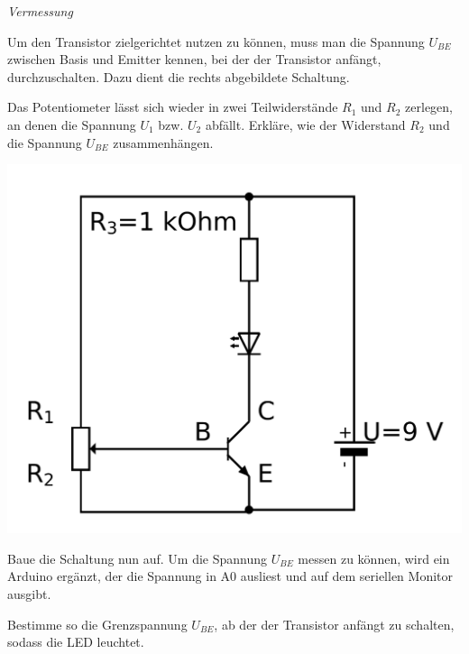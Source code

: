 \begin{aufgabe} \emph{Vermessung}
	
	\medskip
	\begin{minipage}{0.58\textwidth}
		Um den Transistor zielgerichtet nutzen zu können, muss man die Spannung $U_{BE}$ zwischen Basis und Emitter kennen, bei der der Transistor anfängt, durchzuschalten. Dazu dient die rechts abgebildete Schaltung.
		
		Das Potentiometer lässt sich wieder in zwei Teilwiderstände $R_1$ und $R_2$ zerlegen, an denen die Spannung $U_1$ bzw. $U_2$ abfällt. Erkläre, wie der Widerstand $R_2$ und die Spannung $U_{BE}$ zusammenhängen.
	\end{minipage}
	\hfill
	\begin{minipage}{0.38\textwidth}
		\centering
		\includegraphics[width=\textwidth]{./Zeichnungen/Schaltplan-U-BE-Messung1.png}
	\end{minipage}

	\begin{minipage}[c][8cm][t]{0.58\textwidth}
		Baue die Schaltung nun auf. Um die Spannung $U_{BE}$ messen zu können, wird ein Arduino ergänzt, der die Spannung in A0 ausliest und auf dem seriellen Monitor ausgibt. 
		
		Bestimme so die Grenzspannung $U_{BE}$, ab der der Transistor anfängt zu schalten, sodass die LED leuchtet.
		

\end{minipage}
\end{aufgabe}
